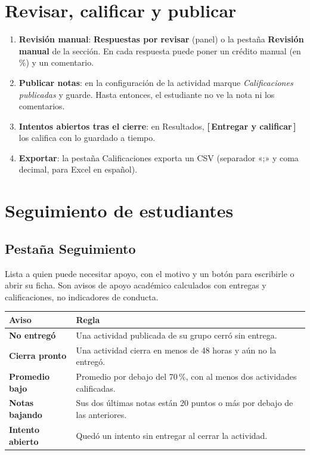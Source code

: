 \documentclass[11pt,a4paper,oneside]{book}
\newcommand{\boton}[1]{\textsf{\textbf{[\,#1\,]}}}
\newcommand{\menu}[1]{\textsf{\textbf{#1}}}
\begin{document}
\chapter{Revisar, calificar y publicar}
\begin{enumerate}
  \item \textbf{Revisión manual}: \menu{Respuestas por revisar} (panel) o la pestaña \menu{Revisión manual} de la
        sección. En cada respuesta puede poner un crédito manual (en \%) y un comentario.
  \item \textbf{Publicar notas}: en la configuración de la actividad marque \emph{Calificaciones publicadas} y guarde.
        Hasta entonces, el estudiante no ve la nota ni los comentarios.
  \item \textbf{Intentos abiertos tras el cierre}: en Resultados, \boton{Entregar y calificar} los califica con lo
        guardado a tiempo.
  \item \textbf{Exportar}: la pestaña Calificaciones exporta un CSV (separador «;» y coma decimal, para Excel en español).
\end{enumerate}

\chapter{Seguimiento de estudiantes}

\section{Pestaña Seguimiento}
Lista a quien puede necesitar apoyo, con el motivo y un botón para escribirle o abrir su ficha. Son avisos de apoyo
académico calculados con entregas y calificaciones, no indicadores de conducta.

\begin{center}
\begin{tabularx}{\linewidth}{>{\bfseries}l X}
\toprule
Aviso & Regla \\
\midrule
No entregó & Una actividad publicada de su grupo cerró sin entrega. \\
Cierra pronto & Una actividad cierra en menos de 48 horas y aún no la entregó. \\
Promedio bajo & Promedio por debajo del 70\,\%, con al menos dos actividades calificadas. \\
Notas bajando & Sus dos últimas notas están 20 puntos o más por debajo de las anteriores. \\
Intento abierto & Quedó un intento sin entregar al cerrar la actividad. \\
\bottomrule
\end{tabularx}
\end{center}
\end{document}
